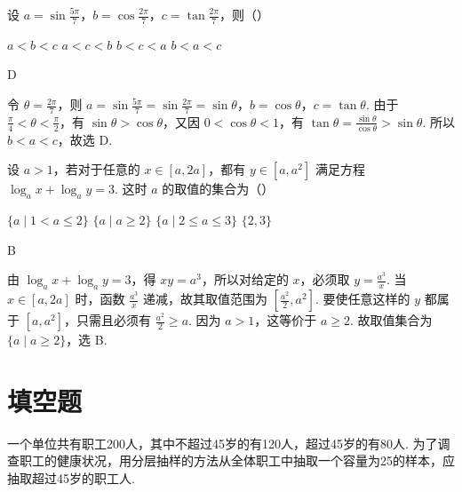 \begin{problem}
设 \(a = \sin \frac{5\pi}{7}\)，\(b = \cos \frac{2\pi}{7}\)，\(c = \tan \frac{2\pi}{7}\)，则（\quad）

\choices
    {\(a < b < c\)}
    {\(a < c < b\)}
    {\(b < c < a\)}
    {\(b < a < c\)}
\end{problem}

\begin{answer}
D
\end{answer}

\begin{solution}
令 \(\theta=\frac{2\pi}{7}\)，则 \(a=\sin\frac{5\pi}{7}=\sin\frac{2\pi}{7}=\sin\theta\)，\(b=\cos\theta\)，\(c=\tan\theta\). 由于 \(\frac{\pi}{4}<\theta<\frac{\pi}{2}\)，有 \(\sin\theta>\cos\theta\)，又因 \(0<\cos\theta<1\)，有 \(\tan\theta=\frac{\sin\theta}{\cos\theta}>\sin\theta\). 所以 \(b<a<c\)，故选 D.
\end{solution}

\begin{problem}
设 \(a > 1\)，若对于任意的 \(x \in [a, 2a]\)，都有 \(y \in [a, a^2]\) 满足方程 \(\log_a x + \log_a y = 3\). 这时 \(a\) 的取值的集合为（\quad）

\choices
    {\(\{a\mid 1 < a \leqslant 2\}\)}
    {\(\{a\mid a \geqslant 2\}\)}
    {\(\{a\mid 2 \leqslant a \leqslant 3\}\)}
    {\(\{2, 3\}\)}
\end{problem}

\begin{answer}
B
\end{answer}

\begin{solution}
由 \(\log_a x+\log_a y=3\)，得 \(xy=a^3\)，所以对给定的 \(x\)，必须取 \(y=\frac{a^3}{x}\). 当 \(x\in[a,2a]\) 时，函数 \(\frac{a^3}{x}\) 递减，故其取值范围为
\(\left[\frac{a^2}{2},a^2\right]\). 要使任意这样的 \(y\) 都属于 \([a,a^2]\)，只需且必须有 \(\frac{a^2}{2}\geqslant a\). 因为 \(a>1\)，这等价于 \(a\geqslant2\). 故取值集合为 \(\{a\mid a\geqslant2\}\)，选 B.
\end{solution}

\section{填空题}

\begin{problem}
一个单位共有职工200人，其中不超过45岁的有120人，超过45岁的有80人. 为了调查职工的健康状况，用分层抽样的方法从全体职工中抽取一个容量为25的样本，应抽取超过45岁的职工\fillinblank{}人.
\end{problem}

